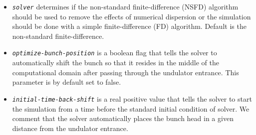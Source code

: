 \begin{itemize}
	\item {\tt \em \small solver} determines if the non-standard finite-difference (NSFD) algorithm should be used to remove the effects of numerical dispersion or the simulation should be done with a simple finite-difference (FD) algorithm. Default is the non-standard finite-difference.
	\item {\tt \em \small optimize-bunch-position} is a boolean flag that tells the solver to automatically shift the bunch so that it resides in the middle of the computational domain after passing through the undulator entrance. This parameter is by default set to false.
	\item {\tt \em \small initial-time-back-shift} is a real positive value that tells the solver to start the simulation from a time before the standard initial condition of solver. We comment that the solver automatically places the bunch head in a given distance from the undulator entrance.
\end{itemize}

